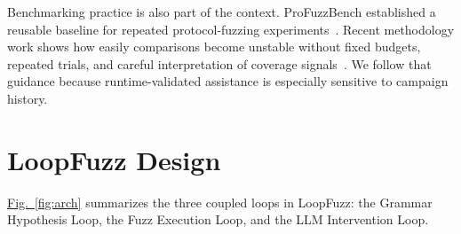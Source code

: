 \documentclass[final,5p,times,number]{elsarticle}
\newcommand{\figref}[1]{\hyperref[#1]{Fig.~\ref*{#1}}}
\begin{document}
Benchmarking practice is also part of the context. ProFuzzBench established a reusable baseline for repeated protocol-fuzzing experiments~\cite{profuzzbench_benchmark_stateful_protocol_2021}. Recent methodology work shows how easily comparisons become unstable without fixed budgets, repeated trials, and careful interpretation of coverage signals~\cite{sok_prudent_evaluation_practices_2024,reliability_benchmarking_2022,many_stack_2022}. We follow that guidance because runtime-validated assistance is especially sensitive to campaign history.

\section{LoopFuzz Design}

\figref{fig:arch} summarizes the three coupled loops in LoopFuzz: the Grammar Hypothesis Loop, the Fuzz Execution Loop, and the LLM Intervention Loop.
\end{document}
